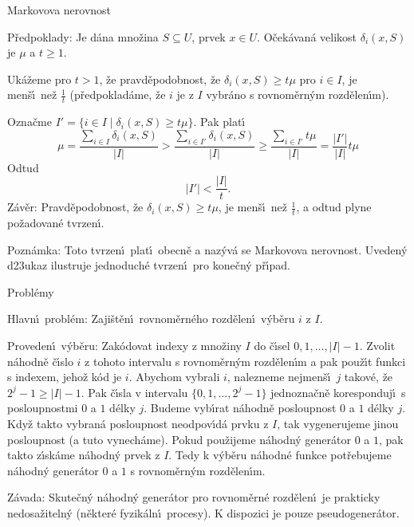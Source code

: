 \documentclass[a4paper,12pt]{article}
\begin{document}
\subhead
Markovova nerovnost
\endsubhead
\smallskip

\flushpar P\v redpoklady: Je d\'ana mno\v zina $S\subseteq U$, prvek $
x\in U$. 
O\v cek\'a\-va\-n\'a velikost $\delta_i(x,S)$ je $\mu$ a $t\ge 
1$.
\medskip

\flushpar Uk\'a\v zeme pro $t>1$, \v ze pravd\v epodobnost, \v ze $
\delta_i(x,S)\ge t\mu$ 
pro $i\in I$, je men\v s\'\i\ ne\v z $\frac 1t$ (p\v redpoklad\'ame, \v ze $
i$ je z $I$ vybr\'ano s 
rovnom\v ern\'ym rozd\v elen\'\i m).  
\medskip

\flushpar Ozna\v cme $I'=\{i\in I\mid\delta_i(x,S)\ge t\mu \}$. Pak plat\'\i
$$\mu =\frac {\sum_{i\in I}\delta_i(x,S)}{|I|}>\frac {\sum_{i\in 
I'}\delta_i(x,S)}{|I|}\ge\frac {\sum_{i\in I'}t\mu}{|I|}=\frac {|
I'|}{|I|}t\mu$$
\flushpar Odtud
$$|I'|<\frac {|I|}t.$$
\flushpar Z\'av\v er: Pravd\v epodobnost, \v ze $\delta_i(x,S)\ge 
t\mu$, je men\v s\'\i\ 
ne\v z $\frac 1t$, a odtud plyne po\v zadovan\'e tvrzen\'\i . 
\medskip

\flushpar Pozn\'amka: Toto tvrzen\'\i\ plat\'\i\ obecn\v e a naz\'yv\'a 
se Markovova nerovnost. Uveden\'y d\accent23ukaz 
ilustruje jednoduch\'e tvrzen\'\i\ pro ko\-ne\v c\-n\'y p\v r\'\i pad.
\medskip

\subhead
Probl\'emy
\endsubhead
\smallskip

\flushpar Hlavn\'\i\ probl\'em: Zaji\v st\v en\'\i\ rovnom\v ern\'eho rozd\v elen\'\i\ 
v\'yb\v eru $i$ z $I$.
\medskip

\flushpar Proveden\'\i\ v\'yb\v eru: Zak\'odovat indexy z mno\v ziny $
I$ do 
\v c\'\i sel $0,1,\dots,|I|-1$. Zvolit n\'ahodn\v e \v c\'\i slo $
i$ z tohoto 
intervalu s rovnom\v ern\'ym rozd\v elen\'\i m a pak pou\v z\'\i t 
funkci s indexem, jeho\v z k\'od je $i$. Abychom vybrali $i$, nalezneme 
nejmen\v s\'\i\ $j$ takov\'e, \v ze $2^j-1\ge |I|-1$. Pak \v c\'\i sla v 
intervalu $\{0,1,\dots,2^j-1\}$ jednozna\v cn\v e koresponduj\'\i\ s 
posloupnostmi $0$ a $1$ d\'elky $j$. Budeme vyb\'\i rat n\'ahodn\v e 
posloupnost $0$ a $1$ d\'elky $j$. Kdy\v z takto vybran\'a posloupnost neodpov\'\i d\'a prvku z $I$, tak vygenerujeme jinou posloupnost (a tuto vynech\'ame). Pokud pou\v zijeme n\'ahodn\'y gener\'ator $0$ a $1$, pak takto z\'\i sk\'ame n\'ahodn\'y prvek z $I$. Tedy k v\'yb\v eru n\'ahodn\'e funkce pot\v rebujeme  
n\'ahodn\'y gener\'ator $0$ a $1$ s rovnom\v ern\'ym rozd\v ele\-n\'\i m.
\medskip

\flushpar Z\'avada: Skute\v cn\'y n\'ahodn\'y gener\'ator pro 
rovnom\v ern\'e rozd\v ele\-n\'\i\ je prakticky nedosa\v ziteln\'y 
(n\v ekter\'e fyzik\'aln\'\i\ procesy). K dispozici je pouze 
pseudogener\'ator. 
\medskip
\end{document}
